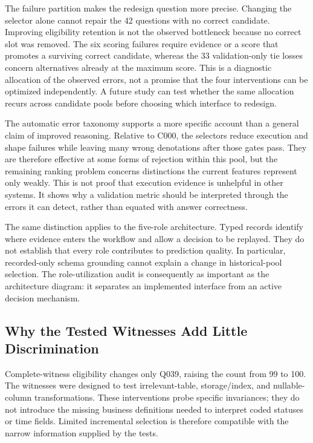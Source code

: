 \documentclass[information,article,submit,moreauthors]{Definitions/mdpi}
\begin{document}
The failure partition makes the redesign question more precise. Changing the selector alone cannot repair the 42 questions with no correct candidate. Improving eligibility retention is not the observed bottleneck because no correct slot was removed. The six scoring failures require evidence or a score that promotes a surviving correct candidate, whereas the 33 validation-only tie losses concern alternatives already at the maximum score. This is a diagnostic allocation of the observed errors, not a promise that the four interventions can be optimized independently. A future study can test whether the same allocation recurs across candidate pools before choosing which interface to redesign.

The automatic error taxonomy supports a more specific account than a general claim of improved reasoning. Relative to C000, the selectors reduce execution and shape failures while leaving many wrong denotations after those gates pass. They are therefore effective at some forms of rejection within this pool, but the remaining ranking problem concerns distinctions the current features represent only weakly. This is not proof that execution evidence is unhelpful in other systems. It shows why a validation metric should be interpreted through the errors it can detect, rather than equated with answer correctness.

The same distinction applies to the five-role architecture. Typed records identify where evidence enters the workflow and allow a decision to be replayed. They do not establish that every role contributes to prediction quality. In particular, recorded-only schema grounding cannot explain a change in historical-pool selection. The role-utilization audit is consequently as important as the architecture diagram: it separates an implemented interface from an active decision mechanism.

\subsection{Why the Tested Witnesses Add Little Discrimination}

Complete-witness eligibility changes only Q039, raising the count from 99 to 100. The witnesses were designed to test irrelevant-table, storage/index, and nullable-column transformations. These interventions probe specific invariances; they do not introduce the missing business definitions needed to interpret coded statuses or time fields. Limited incremental selection is therefore compatible with the narrow information supplied by the tests.
\end{document}
